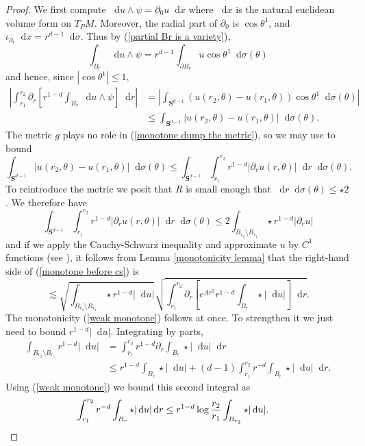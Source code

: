 \documentclass[reqno,12pt,letterpaper]{amsart}
\newcommand{\Sph}{\mathbf S}
\newcommand*\dif{\mathop{}\!\mathrm{d}}
\theoremstyle{definition}
\numberwithin{equation}{section}
\begin{document}
\begin{proof}
We first compute $\dif u \wedge \psi = \partial_0 u \dif x$
where $\dif x$ is the natural euclidean volume form on $T_PM$.
Moreover, the radial part of $\partial_0$ is $\cos \theta^1$, and $\iota_{\partial_r} \dif x = r^{d - 1} \dif \sigma$.
Thus by (\ref{partial Br is a variety}),
$$\int_{B_r} \dif u \wedge \psi = r^{d - 1}\int_{\partial B_r} u \cos \theta^1 \dif \sigma(\theta)$$
and hence, since $|\cos \theta^1| \leq 1$,
\begin{align}
\left|\int_{r_1}^{r_2} \partial_r \left[r^{1 - d}\int_{B_r} \dif u \wedge \psi\right] \dif r\right|
&= \left|\int_{\Sph^{d - 1}} (u(r_2, \theta) - u(r_1, \theta)) \cos \theta^1 \dif \sigma(\theta)\right| \\
&\leq \int_{\Sph^{d - 1}} |u(r_2, \theta) - u(r_1, \theta)| \dif \sigma(\theta). \label{monotone dump the metric}
\end{align}
The metric $g$ plays no role in (\ref{monotone dump the metric}), so we may use \cite[Lemma 5.3]{Giusti77} to bound
$$\int_{\Sph^{d - 1}} |u(r_2, \theta) - u(r_1, \theta)| \dif \sigma(\theta) \leq \int_{\Sph^{d - 1}} \int_{r_1}^{r_2} r^{1 - d}|\partial_r u(r, \theta)| \dif r \dif\sigma(\theta).$$
To reintroduce the metric we posit that $R$ is small enough that $\dif r \dif \sigma(\theta) \leq \star 2$.
We therefore have
\begin{equation}\label{monotone before cs}
\int_{\Sph^{d - 1}} \int_{r_1}^{r_2} r^{1 - d}|\partial_r u(r, \theta)| \dif r \dif\sigma(\theta) \leq 2 \int_{B_{r_2} \setminus B_{r_1}} \star r^{1 - d}|\partial_r u|
\end{equation}
and if we apply the Cauchy-Schwarz inequality and approximate $u$ by $C^1$ functions (see \cite[pg68]{Giusti77}), it follows from Lemma \ref{monotonicity lemma} that the right-hand side of (\ref{monotone before cs}) is
$$\lesssim \sqrt{\int_{B_{r_2} \setminus B_{r_1}} \star r^{1 - d} |\dif u|} \sqrt{\int_{r_1}^{r_2} \partial_r \left[e^{Ar^2} r^{1-d}\int_{B_r} \star |\dif u|\right] \dif r}.$$
The monotonicity (\ref{weak monotone}) follows at once. To strengthen it we just need to bound $r^{1 - d} |\dif u|$.
Integrating by parts,
\begin{align*}
\int_{B_{r_2} \setminus B_{r_1}} r^{1 - d} |\dif u| &= \int_{r_1}^{r_2} r^{1 - d} \partial_r \int_{B_r} \star |\dif u| \dif r \\
&\leq r^{1 - d} \int_{B_r} \star |\dif u| + (d - 1) \int_{r_1}^{r_2} r^{-d} \int_{B_r} \star |\dif u| \dif r.
\end{align*}
Using (\ref{weak monotone}) we bound this second integral as
\begin{align*}
\int_{r_1}^{r_2} r^{-d} \int_{B_r} \star |\dif u| \dif r &\leq r^{1 - d} \log \frac{r_2}{r_1} \int_{B_{r_2}} \star |\dif u|. \qedhere
\end{align*}
\end{proof}
\end{document}

